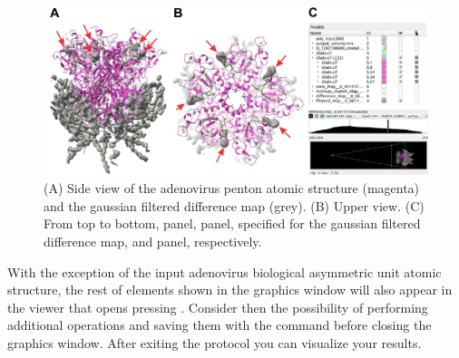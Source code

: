 \begin{itemize}
                            \begin{figure}[H]
                            \centering 
                            \captionsetup{width=.9\linewidth} 
                            \includegraphics[width=.9\textwidth]{Images_appendix/Fig312.pdf}
                            \caption{(A) Side view of the adenovirus penton atomic structure (magenta) and the gaussian filtered difference map (grey). (B) Upper view. (C) From top to bottom, \chimera {} panel,  panel, specified for the gaussian filtered difference map, and  panel, respectively.}  
                            \label{fig:app_usecase_mapsubtract_3}
                            \end{figure}
                With the exception of the input adenovirus biological asymmetric unit atomic structure, the rest of elements shown in the \chimera graphics window will also appear in the \chimera viewer that opens pressing . Consider then the possibility of performing additional operations and saving them with the  command before closing the graphics window. After exiting the protocol you can visualize your results.
                

\end{itemize}
